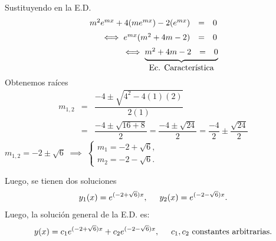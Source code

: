 \documentclass{beamer}
\begin{document}
\begin{frame}[t]
	\begin{exampleblock}{}
		Sustituyendo en la E.D.
		\[
			\begin{array}{rcl}
				m^2e^{mx} +4(me^{mx}) -2(e^{mx}) & = & 0 \\[2mm]
				\iff e^{mx} (m^2+4m-2) & = & 0 \\[2mm]
				\iff \underbrace{\begin{matrix} m^2+4m-2 & = & 0 \end{matrix} } _{\mbox{Ec. Característica}} \hspace{-12mm}
			\end{array}
		\]
		Obtenemos raíces
		\[
			\begin{array}{rcl}
				m_{1,2} & = & \dfrac{-4 \pm \sqrt{4^2-4(1) (2)}}{2(1)} \\[2mm]
				& = & \dfrac{-4 \pm \sqrt{16+8}}{2} = \dfrac{-4 \pm \sqrt{24}}{2} = \dfrac{-4}{2} \pm \dfrac{\sqrt{24}}{2}
			\end{array}
		\]
		\(m_{1,2} = -2 \pm \sqrt{6} \;\implies\; \begin{cases}
			m_1 = -2 + \sqrt{6},\\
			m_2 = -2 - \sqrt{6}.
		\end{cases}\)
	\end{exampleblock}
\end{frame}

\begin{frame}[t]
	\begin{exampleblock}{}
		Luego, se tienen dos soluciones
		\[
			y_1(x) = e^{(-2+ \sqrt{6}) x}, \hspace{5mm} y_2(x) = e^{(-2- \sqrt{6}) x}.
		\]
		Luego, la solución general de la E.D. es:
		\[
			y(x) = c_1e^{(-2+ \sqrt{6}) x} + c_2e^{(-2- \sqrt{6}) x}, \hspace{5mm} c_1,c_2 \mbox{ constantes arbitrarias.}
		\]
	\end{exampleblock}
\end{frame}
\end{document}
